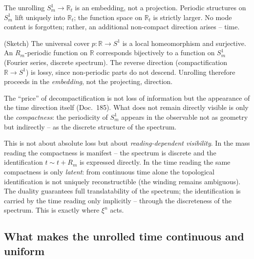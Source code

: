 \begin{theorem}\label{satz:typeI}
The unrolling $S^1_m \to \mathbb{R}_t$ is an embedding, not a projection.
Periodic structures on $S^1_m$ lift uniquely into $\mathbb{R}_t$; the function
space on $\mathbb{R}_t$ is strictly larger. No mode content is forgotten;
rather, an additional non-compact direction arises -- time.
\end{theorem}

\begin{beweis}
(Sketch) The universal cover $p:\mathbb{R}\to S^1$ is a local homeomorphism and
surjective. An $R_m$-periodic function on $\mathbb{R}$ corresponds bijectively to
a function on $S^1_m$ (Fourier series, discrete spectrum). The reverse direction
(compactification $\mathbb{R}\to S^1$) is lossy, since non-periodic parts do not
descend. Unrolling therefore proceeds in the \emph{embedding}, not the
projecting, direction.
\end{beweis}

\begin{corollary}
The ``price'' of decompactification is not loss of information but the
appearance of the time direction itself (Doc.~185). What does not remain
directly visible is only the \emph{compactness}: the periodicity of $S^1_m$
appears in the observable not as geometry but indirectly -- as the discrete
structure of the spectrum.
\end{corollary}

\begin{remark}\label{bem:residual}
This is not about absolute loss but about \emph{reading-dependent visibility}.
In the mass reading the compactness is manifest -- the spectrum is discrete and
the identification $t \sim t + R_m$ is expressed directly. In the time reading
the same compactness is only \emph{latent}: from continuous time alone the
topological identification is not uniquely reconstructible (the winding remains
ambiguous). The duality guarantees full translatability of the spectrum; the
identification is carried by the time reading only implicitly -- through the
discreteness of the spectrum. This is exactly where $\xi^n$ acts.
\end{remark}

\subsection{What makes the unrolled time continuous and uniform}

